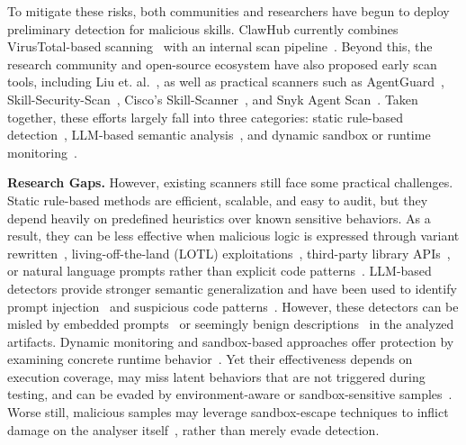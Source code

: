 To mitigate these risks, both communities and researchers have begun to deploy preliminary detection for malicious skills. ClawHub currently combines VirusTotal-based scanning~\cite{openclaw-virustotal} with an internal scan pipeline~\cite{clawhub-moderation-engine}. Beyond this, the research community and open-source ecosystem have also proposed early scan tools, including Liu et. al.~\cite{liu2026maliciousagentskillswild}, as well as practical scanners such as AgentGuard~\cite{goplus-agentguard}, Skill-Security-Scan~\cite{huifer-skill-security-scan}, Cisco's Skill-Scanner~\cite{cisco-skill-scanner}, and Snyk Agent Scan~\cite{snyk-agent-scan}. Taken together, these efforts largely fall into three categories: static rule-based detection~\cite{snyk-agent-scan,huifer-skill-security-scan,goplus-agentguard}, LLM-based semantic analysis~\cite{cisco-skill-scanner,roccia2026novaproximity}, and dynamic sandbox or runtime monitoring~\cite{liu2026maliciousagentskillswild}.

\noindent \textbf{Research Gaps.} However, existing scanners still face some practical challenges. Static rule-based methods are efficient, scalable, and easy to audit, but they depend heavily on predefined heuristics over known sensitive behaviors. As a result, they can be less effective when malicious logic is expressed through variant rewritten~\cite{certik-skill-scanning-boundary,snyk-skill-scanner-false-security,behera2026skillscannercompared}, living-off-the-land (LOTL) exploitations~\cite{lolbas,fortinet-lotl}, third-party library APIs~\cite{huang2024spiderscan}, or natural language prompts rather than explicit code patterns~\cite{snyk2026skills}. LLM-based detectors provide stronger semantic generalization and have been used to identify prompt injection~\cite{snyk-agent-scan,cisco-skill-scanner,behera2026skillscannercompared} and suspicious code patterns~\cite{liu2026maliciousagentskillswild,di2024posterllm,wang2025malpacdetector,zahan2025socketai}. However, these detectors can be misled by embedded prompts~\cite{melo2025aimalwarepromptinjection,checkpoint2025aievasion} or seemingly benign descriptions~\cite{certik-skill-scanning-boundary} in the analyzed artifacts. Dynamic monitoring and sandbox-based approaches offer protection by examining concrete runtime behavior~\cite{behera2026skillscannercompared,liu2026maliciousagentskillswild}. Yet their effectiveness depends on execution coverage, may miss latent behaviors that are not triggered during testing, and can be evaded by environment-aware or sandbox-sensitive samples~\cite{cyfirma-malware-evasion,lefaou2024antivirusedr}. Worse still, malicious samples may leverage sandbox-escape techniques to inflict damage on the analyser itself~\cite{edwards2019containerescapes,jian2017dockerescape}, rather than merely evade detection.


